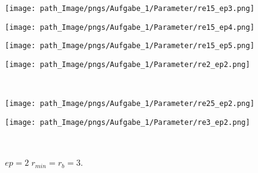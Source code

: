 \begin{figure}[!h]
\begin{minipage}{0.45\textwidth}
\centering
  \texttt{[image: path\_Image/pngs/Aufgabe\_1/Parameter/re15\_ep3.png]}
	\caption{$ep = 3\; r_{min} = r_{b}=1.5$.} 
	\label{fig_comp_ep_3}
\end{minipage}
\hfill
\begin{minipage}{0.45\textwidth}
\centering
  \texttt{[image: path\_Image/pngs/Aufgabe\_1/Parameter/re15\_ep4.png]}
	\caption{$ep = 4\; r_{min} = r_{b}=1.5$.} 
	\label{fig_comp_ep_4}
	\end{minipage}
	\vspace{1cm}
	\begin{minipage}{0.45\textwidth}
	\centering
  \texttt{[image: path\_Image/pngs/Aufgabe\_1/Parameter/re15\_ep5.png]}
	\caption{$ep = 5\; r_{min} = r_{b}=1.5$.} 
	\label{fig_comp_ep_5}
\end{minipage}
\hfill
\begin{minipage}{0.45\textwidth}
\centering
  \texttt{[image: path\_Image/pngs/Aufgabe\_1/Parameter/re2\_ep2.png]}
	\caption{$ep = 2\; r_{min} = r_{b}=2$.} 
	\label{fig_comp_re_2}
	\end{minipage}\\
	
	\begin{minipage}{0.45\textwidth}
	\centering
  \texttt{[image: path\_Image/pngs/Aufgabe\_1/Parameter/re25\_ep2.png]}
	\caption{$ep = 2\; r_{min} = r_{b}=2.5$.} 
	\label{fig_comp_re_2_5}
	\end{minipage}
	\hfill
	\begin{minipage}{0.45\textwidth}
	\centering
  \texttt{[image: path\_Image/pngs/Aufgabe\_1/Parameter/re3\_ep2.png]}
	\caption{$ep = 2\; r_{min} = r_{b}=3$.} 
	\label{fig_comp_re_3}
\end{minipage}\\
\end{figure}~\\




